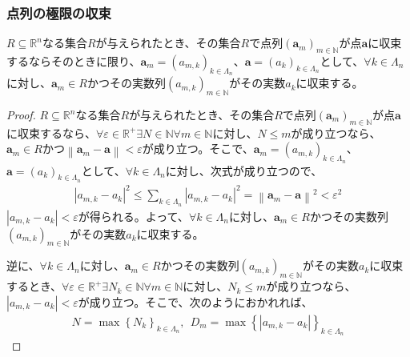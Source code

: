 \documentclass[dvipdfmx]{jsarticle}
\begin{document}
\subsubsection{点列の極限の収束}%
\begin{thm}\label{4.1.4.6}
$R \subseteq \mathbb{R}^{n}$なる集合$R$が与えられたとき、その集合$R$で点列$\left( \mathbf{a}_{m} \right)_{m \in \mathbb{N}}$が点$\mathbf{a}$に収束するならそのときに限り、$\mathbf{a}_{m} = \left( a_{m,k} \right)_{k \in \varLambda_{n}}$、$\mathbf{a} = \left( a_{k} \right)_{k \in \varLambda_{n}}$として、$\forall k \in \varLambda_{n}$に対し、$\mathbf{a}_{m} \in R$かつその実数列$\left( a_{m,k} \right)_{m \in \mathbb{N}}$がその実数$a_{k}$に収束する。
\end{thm}
\begin{proof}
$R \subseteq \mathbb{R}^{n}$なる集合$R$が与えられたとき、その集合$R$で点列$\left( \mathbf{a}_{m} \right)_{m \in \mathbb{N}}$が点$\mathbf{a}$に収束するなら、$\forall\varepsilon \in \mathbb{R}^{+}\exists N \in \mathbb{N}\forall m \in \mathbb{N}$に対し、$N \leq m$が成り立つなら、$\mathbf{a}_{m} \in R$かつ$\left\| \mathbf{a}_{m} - \mathbf{a} \right\| < \varepsilon$が成り立つ。そこで、$\mathbf{a}_{m} = \left( a_{m,k} \right)_{k \in \varLambda_{n}}$、$\mathbf{a} = \left( a_{k} \right)_{k \in \varLambda_{n}}$として、$\forall k \in \varLambda_{n}$に対し、次式が成り立つので、
\begin{align*}
\left| a_{m,k} - a_{k} \right|^{2} \leq \sum_{k \in \varLambda_{n}} \left| a_{m,k} - a_{k} \right|^{2} = \left\| \mathbf{a}_{m} - \mathbf{a} \right\|^{2} < \varepsilon^{2}
\end{align*}
$\left| a_{m,k} - a_{k} \right| < \varepsilon$が得られる。よって、$\forall k \in \varLambda_{n}$に対し、$\mathbf{a}_{m} \in R$かつその実数列$\left( a_{m,k} \right)_{m \in \mathbb{N}}$がその実数$a_{k}$に収束する。\par
逆に、$\forall k \in \varLambda_{n}$に対し、$\mathbf{a}_{m} \in R$かつその実数列$\left( a_{m,k} \right)_{m \in \mathbb{N}}$がその実数$a_{k}$に収束するとき、$\forall\varepsilon \in \mathbb{R}^{+}\exists N_{k} \in \mathbb{N}\forall m \in \mathbb{N}$に対し、$N_{k} \leq m$が成り立つなら、$\left| a_{m,k} - a_{k} \right| < \varepsilon$が成り立つ。そこで、次のようにおかれれば、
\begin{align*}
N = \max\left\{ N_{k} \right\}_{k \in \varLambda_{n}},\ \ D_{m} = \max\left\{ \left| a_{m,k} - a_{k} \right| \right\}_{k \in \varLambda_{n}}
\end{align*}

\end{proof}
\end{document}
